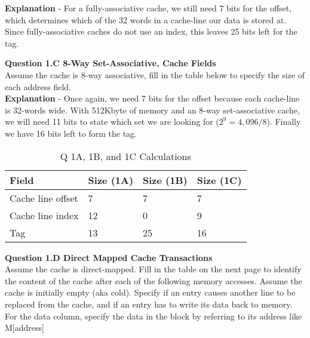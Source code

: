 \documentclass[a4paper,11pt]{article}
\begin{document}
\textbf{Explanation} - For a fully-associative cache, we still need 7 bits for the offset, which determines which of the 32 words in a cache-line our data is stored at. Since fully-associative caches do not use an index, this leaves 25 bits left for the tag. \\


\item \textbf{Question 1.C 8-Way Set-Associative, Cache Fields} \\
Assume the cache is 8-way associative, fill in the table below to specify the size of each address field. \\

\textbf{Explanation} - Once again, we need 7 bits for the offset because each cache-line is 32-words wide. With 512Kbyte of memory and an 8-way set-associative cache, we will need 11 bits to state which set we are looking for ($2^{9} =4,096/8$). Finally we have 16 bits left to form the tag.\\

\begin{table}[H]
\caption{Q 1A, 1B, and 1C Calculations} \label{tab:q1calc} 
\begin{center}
\begin{tabular}{| l | l | l | l |} \hline 
   Field              &  Size (1A) & Size (1B) & Size (1C)     \\ \hline
   Cache line offset  &  7         &   7       &   7           \\ \hline
   Cache line index   &  12        &   0       &   9           \\ \hline
   Tag                &  13        &   25      &   16          \\ \hline
\end{tabular}
\end{center}
\end{table}



\item \textbf{Question 1.D Direct Mapped Cache Transactions } \\

Assume the cache is direct-mapped. Fill in the table on the next page to identify the content of the cache after each of the following memory accesses. Assume the cache is initially empty (aka cold). Specify if an entry causes another line to be replaced from the cache, and if an entry has to write its data back to memory. For the data column, specify the data in the block by referring to its address like M[address]
\end{document}
